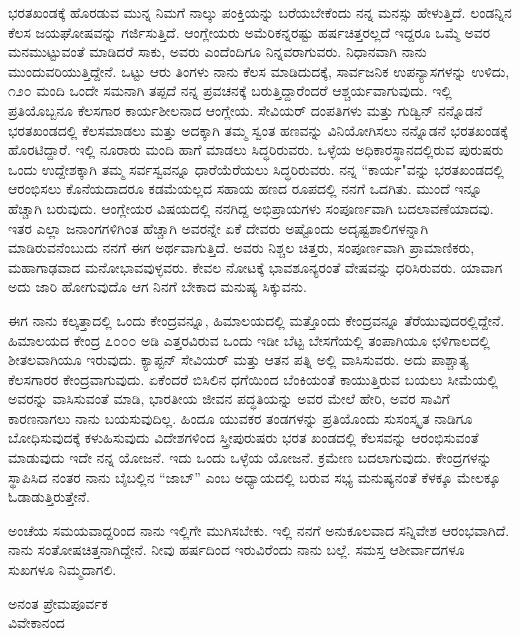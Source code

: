 ಭರತಖಂಡಕ್ಕೆ ಹೊರಡುವ ಮುನ್ನ ನಿಮಗೆ ನಾಲ್ಕು ಪಂಕ್ತಿಯನ್ನು ಬರೆಯಬೇಕೆಂದು ನನ್ನ ಮನಸ್ಸು ಹೇಳುತ್ತಿದೆ. ಲಂಡನ್ನಿನ ಕೆಲಸ ಜಯಘೋಷವನ್ನು ಗರ್ಜಿಸುತ್ತಿದೆ. ಆಂಗ್ಲೇಯರು ಅಮೆರಿಕನ್ನರಷ್ಟು ಹರ್ಷಚಿತ್ತರಲ್ಲದೆ ಇದ್ದರೂ ಒಮ್ಮೆ ಅವರ ಮನಮುಟ್ಟುವಂತೆ ಮಾಡಿದರೆ ಸಾಕು, ಅವರು ಎಂದೆಂದಿಗೂ ನಿನ್ನವರಾಗುವರು. ನಿಧಾನವಾಗಿ ನಾನು ಮುಂದುವರಿಯುತ್ತಿದ್ದೇನೆ. ಒಟ್ಟು ಆರು ತಿಂಗಳು ನಾನು ಕೆಲಸ ಮಾಡಿದುದಕ್ಕೆ, ಸಾರ್ವಜನಿಕ ಉಪನ್ಯಾಸಗಳನ್ನು ಉಳಿದು, ೧೨೦ ಮಂದಿ ಒಂದೇ ಸಮನಾಗಿ ತಪ್ಪದೆ ನನ್ನ ಪ್ರವಚನಕ್ಕೆ ಬರುತ್ತಿದ್ದಾರೆಂದರೆ ಆಶ್ಚರ್ಯವಾಗುವುದು. ಇಲ್ಲಿ ಪ್ರತಿಯೊಬ್ಬನೂ ಕೆಲಸಗಾರ\enginline{-} ಕಾರ್ಯಶೀಲನಾದ ಆಂಗ್ಲೇಯ. ಸೇವಿಯರ್ ದಂಪತಿಗಳು ಮತ್ತು ಗುಡ್ವಿನ್ ನನ್ನೊಡನೆ ಭರತಖಂಡದಲ್ಲಿ ಕೆಲಸಮಾಡಲು ಮತ್ತು ಅದಕ್ಕಾಗಿ ತಮ್ಮ ಸ್ವಂತ ಹಣವನ್ನು ವಿನಿಯೋಗಿಸಲು ನನ್ನೊಡನೆ ಭರತಖಂಡಕ್ಕೆ ಹೊರಟಿದ್ದಾರೆ. ಇಲ್ಲಿ ನೂರಾರು ಮಂದಿ ಹಾಗೆ ಮಾಡಲು ಸಿದ್ಧರಿರುವರು. ಒಳ್ಳೆಯ ಅಧಿಕಾರಸ್ಥಾನದಲ್ಲಿರುವ ಪುರುಷರು ಒಂದು ಉದ್ದೇಶಕ್ಕಾಗಿ ತಮ್ಮ ಸರ್ವಸ್ವವನ್ನೂ ಧಾರೆಯೆರೆಯಲು ಸಿದ್ಧರಿರುವರು. ನನ್ನ ``ಕಾರ್ಯ"ವನ್ನು ಭರತಖಂಡದಲ್ಲಿ ಆರಂಭಿಸಲು ಕೊನೆಯದಾದರೂ ಕಡಮೆಯಲ್ಲದ ಸಹಾಯ ಹಣದ ರೂಪದಲ್ಲಿ ನನಗೆ ಒದಗಿತು. ಮುಂದೆ ಇನ್ನೂ ಹೆಚ್ಚಾಗಿ ಬರುವುದು. ಆಂಗ್ಲೇಯರ ವಿಷಯದಲ್ಲಿ ನನಗಿದ್ದ ಅಭಿಪ್ರಾಯಗಳು ಸಂಪೂರ್ಣವಾಗಿ ಬದಲಾವಣೆಯಾದವು. ಇತರ ಎಲ್ಲಾ ಜನಾಂಗಗಳಿಗಿಂತ ಹೆಚ್ಚಾಗಿ ಅವರನ್ನೇ ಏಕೆ ದೇವರು ಅಷ್ಟೊಂದು ಅದೃಷ್ಟಶಾಲಿಗಳನ್ನಾಗಿ ಮಾಡಿರುವನೆಂಬುದು ನನಗೆ ಈಗ ಅರ್ಥವಾಗುತ್ತಿದೆ. ಅವರು ನಿಶ್ಚಲ ಚಿತ್ತರು, ಸಂಪೂರ್ಣವಾಗಿ ಪ್ರಾಮಾಣಿಕರು, ಮಹಾಗಾಢವಾದ ಮನೋಭಾವವುಳ್ಳವರು. ಕೇವಲ ನೋಟಕ್ಕೆ ಭಾವಶೂನ್ಯರಂತೆ ವೇಷವನ್ನು ಧರಿಸಿರುವರು. ಯಾವಾಗ ಅದು ಜಾರಿ ಹೋಗುವುದೊ ಆಗ ನಿನಗೆ ಬೇಕಾದ ಮನುಷ್ಯ ಸಿಕ್ಕುವನು.

ಈಗ ನಾನು ಕಲ್ಕತ್ತಾದಲ್ಲಿ ಒಂದು ಕೇಂದ್ರವನ್ನೂ, ಹಿಮಾಲಯದಲ್ಲಿ ಮತ್ತೊಂದು ಕೇಂದ್ರವನ್ನೂ ತೆರೆಯುವುದರಲ್ಲಿದ್ದೇನೆ. ಹಿಮಾಲಯದ ಕೇಂದ್ರ ೭೦೦೦ ಅಡಿ ಎತ್ತರವಿರುವ ಒಂದು ಇಡೀ ಬೆಟ್ಟ\enginline{-} ಬೇಸಗೆಯಲ್ಲಿ ತಂಪಾಗಿಯೂ ಛಳಿಗಾಲದಲ್ಲಿ ಶೀತಲವಾಗಿಯೂ ಇರುವುದು. ಕ್ಯಾಪ್ಟನ್ ಸೇವಿಯರ್ ಮತ್ತು ಆತನ ಪತ್ನಿ ಅಲ್ಲಿ ವಾಸಿಸುವರು. ಅದು ಪಾಶ್ಚಾತ್ಯ ಕೆಲಸಗಾರರ ಕೇಂದ್ರವಾಗುವುದು. ಏಕೆಂದರೆ ಬಿಸಿಲಿನ ಧಗೆಯಿಂದ ಬೆಂಕಿಯಂತೆ ಕಾಯುತ್ತಿರುವ ಬಯಲು ಸೀಮೆಯಲ್ಲಿ ಅವರನ್ನು ವಾಸಿಸುವಂತೆ ಮಾಡಿ, ಭಾರತೀಯ ಜೀವನ ಪದ್ಧತಿಯನ್ನು ಅವರ ಮೇಲೆ ಹೇರಿ, ಅವರ ಸಾವಿಗೆ ಕಾರಣನಾಗಲು ನಾನು ಬಯಸುವುದಿಲ್ಲ. ಹಿಂದೂ ಯುವಕರ ತಂಡಗಳನ್ನು ಪ್ರತಿಯೊಂದು ಸುಸಂಸ್ಕೃತ ನಾಡಿಗೂ ಬೋಧಿಸುವುದಕ್ಕೆ ಕಳುಹಿಸುವುದು\enginline{-} ವಿದೇಶಗಳಿಂದ ಸ್ತ್ರೀಪುರುಷರು ಭರತ ಖಂಡದಲ್ಲಿ ಕೆಲಸವನ್ನು ಆರಂಭಿಸುವಂತೆ ಮಾಡುವುದು\enginline{-} ಇದೇ ನನ್ನ ಯೋಜನೆ. ಇದು ಒಂದು ಒಳ್ಳೆಯ ಯೋಜನೆ. ಕ್ರಮೇಣ ಬದಲಾಗುವುದು. ಕೇಂದ್ರಗಳನ್ನು ಸ್ಥಾಪಿಸಿದ ನಂತರ ನಾನು ಬೈಬಲ್ಲಿನ “ಜಾಬ್” ಎಂಬ ಅಧ್ಯಾಯದಲ್ಲಿ ಬರುವ ಸಭ್ಯ ಮನುಷ್ಯನಂತೆ ಕೆಳಕ್ಕೂ ಮೇಲಕ್ಕೂ ಓಡಾಡುತ್ತಿರುತ್ತೇನೆ.

\vspace{0.15cm}

ಅಂಚೆಯ ಸಮಯವಾದ್ದರಿಂದ ನಾನು ಇಲ್ಲಿಗೇ ಮುಗಿಸಬೇಕು. ಇಲ್ಲಿ ನನಗೆ ಅನುಕೂಲವಾದ ಸನ್ನಿವೇಶ ಆರಂಭವಾಗಿದೆ. ನಾನು ಸಂತೋಷಚಿತ್ತನಾಗಿದ್ದೇನೆ. ನೀವು ಹರ್ಷದಿಂದ ಇರುವಿರೆಂದು ನಾನು ಬಲ್ಲೆ. ಸಮಸ್ತ ಆಶೀರ್ವಾದಗಳೂ ಸುಖಗಳೂ ನಿಮ್ಮದಾಗಲಿ.

\begin{flushright}
ಅನಂತ ಪ್ರೇಮಪೂರ್ವಕ\\ವಿವೇಕಾನಂದ
\end{flushright}

